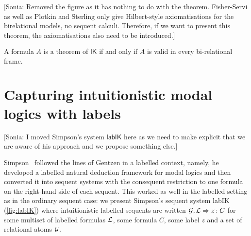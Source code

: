\documentclass[twoside]{aiml18}
\newcommand{\sonia}[1]{{\color{blue}[Sonia: #1]}}
\newcommand*{\lab}{\mathsf{lab}}
\newcommand*{\IK}{\mathsf{IK}}
\newcommand{\SEQ}{\Rightarrow}
\begin{document}
\sonia{Removed the figure as it has nothing to do with the theorem. Fisher-Servi as well as Plotkin and Sterling only give Hilbert-style axiomatisations for the birelational models, no sequent calculi.
	Therefore, if we want to present this theorem, the axiomatisations also need to be introduced.}

\begin{theorem}
	A formula $A$ is a theorem of $\IK$ if and only if $A$ is valid in every bi-relational frame.
\end{theorem}


\section{Capturing intuitionistic modal logics with labels}

\sonia{I moved Simpson's system $\lab\IK$ here as we need to make explicit that we are aware of his approach and we propose something else.}

Simpson~\cite{Simpson} followed the lines of Gentzen in a labelled context, namely, he developed a labelled natural deduction framework for modal logics and then converted it into sequent systems with the consequent restriction to one formula on the right-hand side of each sequent.
This worked as well in the labelled setting as in the ordinary sequent case: we present Simpson's sequent system labIK (\ref{fig:labIK}) where intuitionistic labelled sequents are written $\G, \Left \SEQ z \colon C$ for some multiset of labelled formulas $\mathcal{L}$, some formula $C$, some label $z$ and a set of relational atoms $\mathcal{G}$. 
\end{document}
